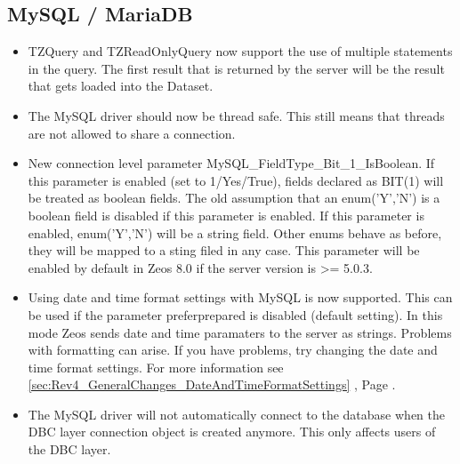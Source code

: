 \documentclass[a4paper,12pt,oneside]{book}
\begin{document}
\subsection{MySQL / MariaDB}
\label{sec:Rev4_DriverSpecificChanges_MysqlMariadb}
\begin{itemize}
\item
  TZQuery and TZReadOnlyQuery now support the use of multiple statements in the query.
	The first result that is returned by the server will be the result that gets loaded into the Dataset.
\item
  The MySQL driver should now be thread safe.
	This still means that threads are not allowed to share a connection.
\item
  New connection level parameter MySQL\_FieldType\_Bit\_1\_IsBoolean.
	If this parameter is enabled (set to 1/Yes/True), fields declared as BIT(1) will be treated as boolean fields.
	The old assumption that an enum('Y','N') is a boolean field is disabled if this parameter is enabled.
	If this parameter is enabled, enum('Y','N') will be a string field.
	Other enums behave as before, they will be mapped to a sting filed in any case.
	This parameter will be enabled by default in Zeos 8.0 if the server version is \textgreater= 5.0.3.
\item
  Using date and time format settings with MySQL is now supported.
	This can be used if the parameter preferprepared is disabled (default setting).
  In this mode Zeos sends date and time paramaters to the server as strings.
	Problems with formatting can arise.
	If you have problems, try changing the date and time format settings.
	For more information see \ref{sec:Rev4_GeneralChanges_DateAndTimeFormatSettings} , Page \pageref{sec:Rev4_GeneralChanges_DateAndTimeFormatSettings}.
\item
  The MySQL driver will not automatically connect to the database when the DBC layer connection object is created anymore.
	This only affects users of the DBC layer.
\end{itemize}
\end{document}
